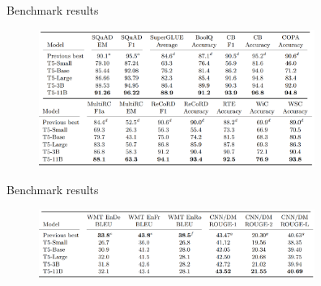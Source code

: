 
\begin{frame}{Benchmark results}

\vfill

	\begin{figure}
		\centering
		\includegraphics[width = 9cm]{figure/63-t5-squad-sglue.png}\\ 
	\end{figure}
	
\vfill

\end{frame}


\begin{frame}{Benchmark results}

\vfill

	\begin{figure}
		\centering
		\includegraphics[width = 9cm]{figure/63-t5-mt.png}\\ 
	\end{figure}
	
\vfill

\end{frame}


